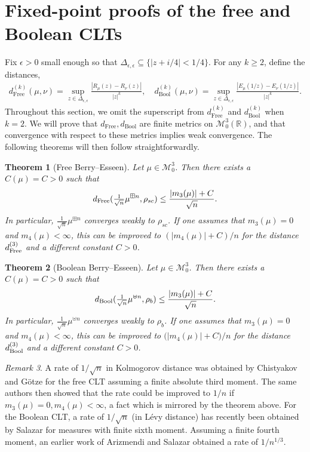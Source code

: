\documentclass{amsart}
\newtheorem{theorem}{Theorem}[section]
\theoremstyle{definition}
\theoremstyle{remark}
\newtheorem{remark}[theorem]{Remark}
\numberwithin{equation}{section}
\begin{document}
\section{Fixed-point proofs of the free and Boolean CLTs}
Fix $\epsilon>0$ small enough so that $\Delta_{\epsilon,\epsilon}\subseteq \{|z+i/4|<1/4\}$. For any $k\geq 2$, define the distances,
\begin{align}\label{metrics}
    d^{(k)}_{\text{Free}}(\mu,\nu)=\sup_{z\in \Delta_{\epsilon,\epsilon}}\frac{|R_\mu(z)-R_\nu(z)|}{|z|^k},\quad  d^{(k)}_{\text{Bool}}(\mu,\nu)=\sup_{z\in \Delta_{\epsilon,\epsilon}}\frac{|E_\mu(1/z)-E_\nu(1/z)|}{|z|^k}.\end{align}
Throughout this section, we omit the superscript from $d^{(k)}_{\text{Free}}$ and $d^{(k)}_{\text{Bool}}$ when $k=2$. We will prove that $d_{\text{Free}}, d_{\text{Bool}}$ are finite metrics on $\mathcal{M}_0^{3}(\mathbb{R})$, and that convergence with respect to these metrics implies weak convergence. The following theorems will then follow straightforwardly.
\begin{theorem}[Free Berry--Esseen]\label{FreeBE} Let $\mu\in \mathcal{M}_0^3$. Then there exists a $C(\mu)=C>0$ such that
\[
    d_{\text{\normalfont Free}}(\tfrac{1}{\sqrt{n}}\mu^{\boxplus n}, \rho_{sc}) \leq \frac{|m_3(\mu)|+C}{\sqrt{n}}.
\]
In particular, $\tfrac{1}{\sqrt{n}}\mu^{\boxplus n}$ converges weakly to $\rho_{sc}$. 
If one assumes that $m_3(\mu)=0$ and $m_4(\mu)<\infty$, this can be improved to $({|m_4(\mu)|+C})/n$ for the distance $d^{(3)}_{\text{\normalfont{Free}}}$ and a different constant $C>0$.
\end{theorem}
\begin{theorem}[Boolean Berry--Esseen]\label{BoolBE} Let $\mu\in \mathcal{M}_0^3$. Then there exists a $C(\mu)=C>0$ such that
\[
    d_{\text{\normalfont{Bool}}}(\tfrac{1}{\sqrt{n}}\mu^{\uplus n}, \rho_b) \leq \frac{|m_3(\mu)|+C}{\sqrt{n}}.
\]
In particular, $\tfrac{1}{\sqrt{n}}\mu^{\uplus n}$ converges weakly to $\rho_{b}$.
If one assumes that $m_3(\mu)=0$ and $m_4(\mu)<\infty$, this can be improved to $({|m_4(\mu)|+C)/n}$ for the distance $d^{(3)}_{\text{\normalfont{Bool}}}$ and a different constant $C>0$.
\end{theorem}
\begin{remark}
    A rate of $1/\sqrt{n}$ in Kolmogorov distance was obtained by Chistyakov and G{\"o}tze \cite{ChistyakovGotze1} for the free CLT assuming a finite {absolute} third moment. The same authors then showed that the rate could be improved to $1/n$ if $m_3(\mu)=0, m_4(\mu)<\infty$, a fact which is mirrored by the theorem above. For the Boolean CLT, a rate of $1/\sqrt{n}$ (in L{\'e}vy distance) has recently been obtained by Salazar \cite{Salazar} for measures with finite sixth moment. Assuming a finite fourth moment, an earlier work of Arizmendi and Salazar \cite{ArizmendiSalazar} obtained a rate of $1/n^{1/3}$.
\end{remark}
\end{document}
